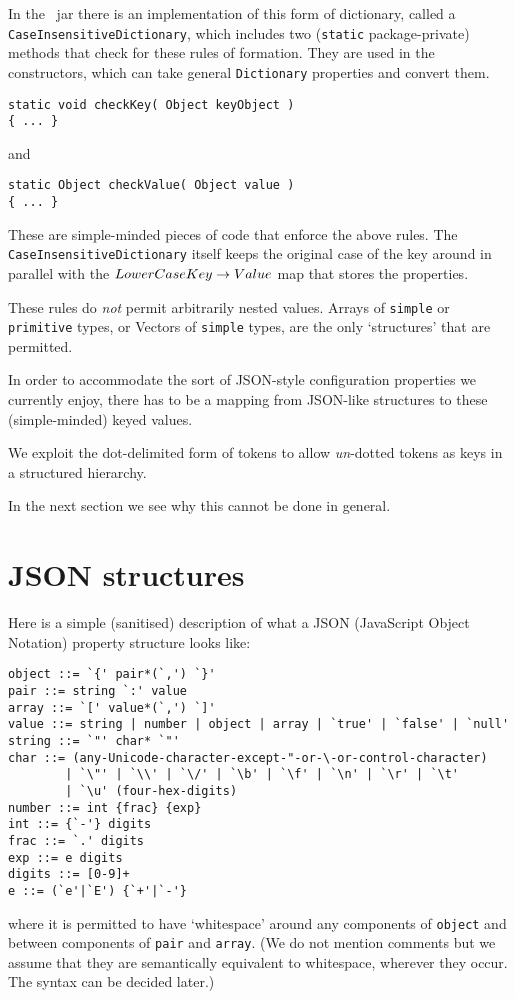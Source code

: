 \documentclass[a4paper,twoside,12pt]{article}
\begin{document}
In the \felix ~jar there is an implementation of this form of dictionary, called a \texttt{CaseInsensitiveDictionary}, which includes two (\texttt{static} package-private) methods that check for these rules of formation. They are used in the constructors, which can take general \texttt{Dictionary} properties and convert them.
\begin{verbatim}
static void checkKey( Object keyObject )
{ ... }
\end{verbatim}
and
\begin{verbatim}
static Object checkValue( Object value )
{ ... }
\end{verbatim}
These are simple-minded pieces of code that enforce the above rules. The  \texttt{CaseInsensitiveDictionary} itself keeps the original case of the key around in parallel with the $LowerCaseKey \rightarrow Value$ map that stores the properties.

These rules do \emph{not} permit arbitrarily nested values. Arrays of \texttt{simple} or \texttt{primitive} types, or Vectors of \texttt{simple} types, are the only `structures' that are permitted.

In order to accommodate the sort of JSON-style configuration properties we currently enjoy, there has to be a mapping from JSON-like structures to these (simple-minded) keyed values.

We exploit the dot-delimited form of tokens to allow \emph{un}-dotted tokens as keys in a structured hierarchy.

In the next section we see why this cannot be done in general.

\section{JSON structures}
Here is a simple (sanitised) description of what a JSON (JavaScript Object Notation) property structure looks like:
\begin{verbatim}
object ::= `{' pair*(`,') `}'
pair ::= string `:' value
array ::= `[' value*(`,') `]'
value ::= string | number | object | array | `true' | `false' | `null'
string ::= `"' char* `"'
char ::= (any-Unicode-character-except-"-or-\-or-control-character)
        | `\"' | `\\' | `\/' | `\b' | `\f' | `\n' | `\r' | `\t'
        | `\u' (four-hex-digits)
number ::= int {frac} {exp}
int ::= {`-'} digits
frac ::= `.' digits
exp ::= e digits
digits ::= [0-9]+
e ::= (`e'|`E') {`+'|`-'}
\end{verbatim}
where it is permitted to have `whitespace' around any components of \texttt{object} and between components of \texttt{pair} and \texttt{array}. (We do not mention comments but we assume that they are semantically equivalent to whitespace, wherever they occur. The syntax can be decided later.)
\end{document}
